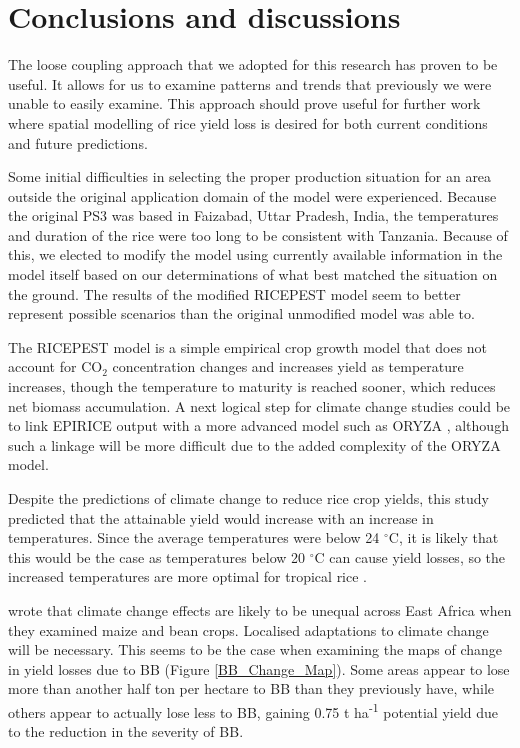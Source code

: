 \documentclass[preprint,review,12pt]{elsarticle}
\begin{document}
    \section{Conclusions and discussions}
    The loose coupling approach that we adopted for this research has proven to be useful. It allows for us to examine patterns and trends that previously we were unable to easily examine. This approach should prove useful for further work where spatial modelling of rice yield loss is desired for both current conditions and future predictions.
    
    Some initial difficulties in selecting the proper production situation for an area outside the original application domain of the model were experienced. Because the original PS3 was based in Faizabad, Uttar Pradesh, India, the temperatures and duration of the rice were too long to be consistent with Tanzania. Because of this, we elected to modify the model using currently available information in the model itself based on our determinations of what best matched the situation on the ground. The results of the modified RICEPEST model seem to better represent possible scenarios than the original unmodified model was able to.
    
    The RICEPEST model is a simple empirical crop growth model that does not account for CO$_2$ concentration changes and increases yield as temperature increases, though the temperature to maturity is reached sooner, which reduces net biomass accumulation. A next logical step for climate change studies could be to link EPIRICE output with a more advanced model such as ORYZA \cite{Oryza}, although such a linkage will be more difficult due to the added complexity of the ORYZA model.
    
    Despite the predictions of climate change to reduce rice crop yields, this study predicted that the attainable yield would increase with an increase in temperatures. Since the average temperatures were below 24 $^{\circ}$C, it is likely that this would be the case as temperatures below 20 $^{\circ}$C can cause yield losses, so the increased temperatures are more optimal for tropical rice \cite{Yoshida}.
            
    \citet{Thornton2009} wrote that climate change effects are likely to be unequal across East Africa when they examined maize and bean crops. Localised adaptations to climate change will be necessary. This seems to be the case when examining the maps of change in yield losses due to BB (Figure \ref{BB_Change_Map}). Some areas appear to lose more than another half ton per hectare to BB than they previously have, while others appear to actually lose less to BB, gaining 0.75 t ha\textsuperscript{-1} potential yield due to the reduction in the severity of BB.
    
\end{document}
